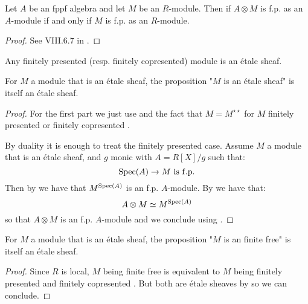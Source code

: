 \begin{lemma}\label{fp-stable-etale-tensor}
Let $A$ be an fppf algebra and let $M$ be an $R$-module. Then if $A\otimes M$ is f.p. as an $A$-module if and only if $M$ is f.p. as an $R$-module.
\end{lemma}

\begin{proof}
See VIII.6.7 in \cite{lombardi-quitte}.
\end{proof}

\begin{lemma}\label{descent-fp-fcop}
Any finitely presented (resp. finitely copresented) module is an \'etale sheaf.

For $M$ a module that is an \'etale sheaf, the proposition "$M$ is an \'etale sheaf" is itself an \'etale sheaf. %
\end{lemma}

\begin{proof}
For the first part we just use  and the fact that $M=M^{\star\star}$ for $M$ finitely presented or finitely copresented \cite{TODO-diffgeo}.

By duality it is enough to treat the finitely presented case. Assume $M$ a module that is an \'etale sheaf, and $g$ monic with $A=R[X]/g$ such that:
\[\Spec(A)\to M\ \mathrm{is\ f.p.}\]
Then by  we have that $M^{\operatorname{Spec}(A)}$ is an f.p. $A$-module. By  we have that:
\[A\otimes M \simeq M^{\operatorname{Spec}(A)}\]
so that $A\otimes M$ is an f.p. $A$-module and we conclude using .
\end{proof}

\begin{proposition}\label{descent-finite-free}
For $M$ a module that is an \'etale sheaf, the proposition "$M$ is an finite free" is itself an \'etale sheaf.
\end{proposition}

\begin{proof}
Since $R$ is local, $M$ being finite free is equivalent to $M$ being finitely presented and finitely copresented \cite{TODO-diffgeo}. But both are \'etale sheaves by  so we can conclude.
\end{proof}


